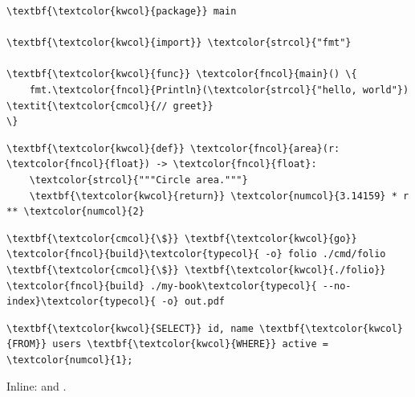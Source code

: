 
\begin{Verbatim}[commandchars=\\\{\}]
\textbf{\textcolor{kwcol}{package}} main

\textbf{\textcolor{kwcol}{import}} \textcolor{strcol}{"fmt"}

\textbf{\textcolor{kwcol}{func}} \textcolor{fncol}{main}() \{
    fmt.\textcolor{fncol}{Println}(\textcolor{strcol}{"hello, world"}) \textit{\textcolor{cmcol}{// greet}}
\}
\end{Verbatim}


\begin{Verbatim}[commandchars=\\\{\}]
\textbf{\textcolor{kwcol}{def}} \textcolor{fncol}{area}(r: \textcolor{fncol}{float}) -> \textcolor{fncol}{float}:
    \textcolor{strcol}{"""Circle area."""}
    \textbf{\textcolor{kwcol}{return}} \textcolor{numcol}{3.14159} * r ** \textcolor{numcol}{2}
\end{Verbatim}


\begin{Verbatim}[commandchars=\\\{\}]
\textbf{\textcolor{cmcol}{\$}} \textbf{\textcolor{kwcol}{go}} \textcolor{fncol}{build}\textcolor{typecol}{ -o} folio ./cmd/folio
\textbf{\textcolor{cmcol}{\$}} \textbf{\textcolor{kwcol}{./folio}} \textcolor{fncol}{build} ./my-book\textcolor{typecol}{ --no-index}\textcolor{typecol}{ -o} out.pdf
\end{Verbatim}


\begin{Verbatim}[commandchars=\\\{\}]
\textbf{\textcolor{kwcol}{SELECT}} id, name \textbf{\textcolor{kwcol}{FROM}} users \textbf{\textcolor{kwcol}{WHERE}} active = \textcolor{numcol}{1};
\end{Verbatim}


Inline:  and .

